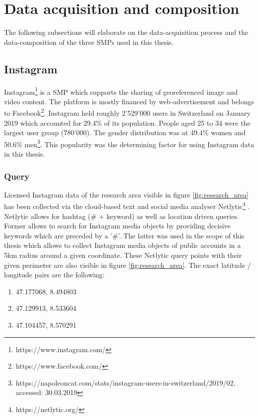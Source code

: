 \section{Data acquisition and composition} \label{data_acquisition}
The following subsections will elaborate on the data-acquisition process and the data-composition of the three SMPs used in this thesis. 

\subsection{Instagram} \label{instagram}
Instagram\footnote{https://www.instagram.com/} is a SMP which supports the sharing of georeferenced image and video content. The platform is mostly financed by web-advertisement and belongs to Facebook\footnote{https://www.facebook.com/}. Instagram held roughly 2'529'000 users in Switzerland on January 2019 which accounted for 29.4\% of its population. People aged 25 to 34 were the largest user group (780'000). The gender distribution was at 49.4\% women and 50.6\% men\footnote{https://napoleoncat.com/stats/instagram-users-in-switzerland/2019/02, accessed: 30.03.2019}. This popularity was the determining factor for using Instagram data in this thesis.\\

\subsubsection*{Query} \label{netlytic}
Licensed Instagram data of the research area visible in figure \ref{fig:research_area} has been collected via the cloud-based text and social media analyser Netlytic\footnote{https://netlytic.org/} \parencite{Gruzd2016}. Netlytic allows for hashtag (\# + keyword) as well as location driven queries. Former allows to search for Instagram media objects by providing decisive keywords which are preceded by a '\#'. The latter was used in the scope of this thesis which allows to collect Instagram media objects of public accounts in a 5km radius around a given coordinate. These Netlytic query points with their given perimeter are also visible in figure \ref{fig:research_area}. The exact latitude / longitude pairs are the following:\\
\begin{enumerate}
  \item 47.177068, 8.494803
  \item 47.129913, 8.533604
  \item 47.104457, 8.570291
\end{enumerate}


